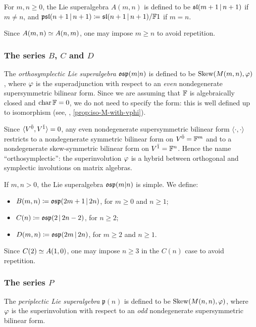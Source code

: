 For $m,n\geq 0$, the Lie superalgebra $A(m,n)$ is defined to be $\mathfrak{sl}(m+1 \,|\, n+1)$ if $m\neq n$, and $\mathfrak{psl}(n+1 \,|\, n+1) \coloneqq \mathfrak{sl}(n+1 \,|\, n+1)/ \mathbb{F} 1$ if $m=n$. 

Since $A(m,n)\simeq A(n,m)$, one may impose $m\geq n$ to avoid repetition. 

\subsubsection{The series $B$, $C$ and $D$}

The \emph{orthosymplectic Lie superalgebra} $\mathfrak{osp}(m|n)$ is defined to be $\operatorname{Skew}(M(m,n),\varphi)$, where $\varphi$ is the superadjunction with respect to an \emph{even} nondegenerate supersymmetric bilinear form. 
Since we are assuming that $\mathbb{F}$ is algebraically closed and $\operatorname{char} \mathbb{F} = 0$, we do not need to specify the form: this is well defined up to isomorphism (see, \eg, \cref{prop:iso-M-with-vphi}). 

Since $\langle V^{\bar0}, V^{\bar1} \rangle = 0$, any even nondegenerate supersymmetric bilinear form $\langle \cdot, \cdot \rangle$ restricts to a nondegenerate symmetric bilinear form on $V^{\bar0} = \mathbb{F}^m$ and to a nondegenerate skew-symmetric bilinear form on $V^{\bar1} = \mathbb{F}^n$. 
Hence the name ``orthosymplectic'': the superinvolution $\varphi$ is a hybrid between orthogonal and symplectic involutions on matrix algebras. 

\label{defi:B-C-D}

If $m,n > 0$, the Lie superalgebra $\mathfrak{osp}(m|n)$ is simple. 
We define:
%
\begin{itemize}
	\item $B(m,n) \coloneqq \mathfrak{osp}(2m+1 \,|\, 2n)$, for $m \geq 0$ and $n \geq 1$;
	\item $C(n) \coloneqq \mathfrak{osp}(2 \,|\,  2n - 2)$, for $n\geq 2$;
	\item $D(m,n) \coloneqq \mathfrak{osp}(2m \,|\, 2n)$, for $m\geq 2$ and $n\geq 1$.
\end{itemize}
%
Since $C(2)\simeq A(1,0)$, one may impose $n\geq 3$ in the $C(n)$ case to avoid repetition.

\subsubsection{The series $P$}

The \emph{periplectic Lie superalgebra} $\mathfrak{p}(n)$ is defined to be $\operatorname{Skew}(M(n,n), \varphi)$, where $\varphi$ is the superinvolution with respect to an \emph{odd} nondegenerate supersymmetric bilinear form.

